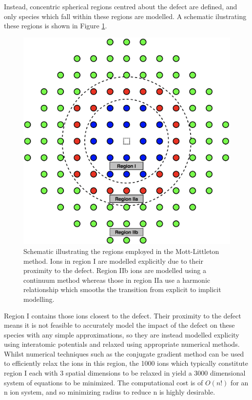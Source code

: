 Instead, concentric spherical regions centred about the defect are defined, and only species which fall within these regions are modelled.
A schematic ilustrating these regions is shown in Figure \ref{fig:mott}. 

\begin{figure}
  \centering
  \includegraphics[width = 0.9\linewidth]{figures/Mott-Littleton}
  \caption[Schematic illustrating the regions employed in the Mott-Littleton method.]{Schematic illustrating the regions employed in the Mott-Littleton method. Ions in region I are modelled explicitly due to their proximity to the defect. Region IIb ions are modelled using a continuum method whereas those in region IIa use a harmonic relationship which smooths the transition from explicit to implicit modelling.}
  \label{fig:mott}
\end{figure}

Region I contains those ions closest to the defect.
Their proximity to the defect means it is not feasible to accurately model the impact of the defect on these species with any simple approximations, so they are instead modelled explicity using interatomic potentials and relaxed using appropriate numerical methods.
Whilst numerical techniques such as the conjugate gradient method can be used to efficiently relax the ions in this region, the 1000 ions which typically constitute region I each with 3 spatial dimensions to be relaxed in yield a 3000 dimensional system of equations to be minimized.
The computational cost is of $O(n!)$ for an n ion system, and so minimizing radius to reduce n is highly desirable.

